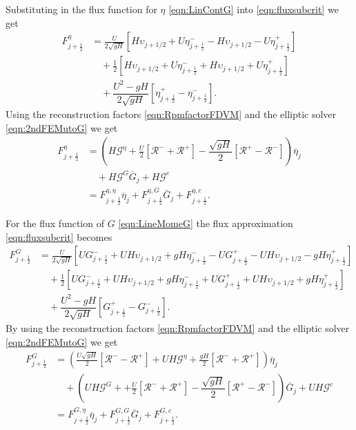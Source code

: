 Substituting in the flux function for $\eta$ \eqref{eqn:LinContG} into \eqref{eqn:fluxsubcrit} we get
\begin{align}
F^\eta_{j+\frac{1}{2}} &= \frac{U}{2 \sqrt{gH}} \left[ H\upsilon_{j+1/2} + U\eta^-_{j+\frac{1}{2}} -  H\upsilon_{j+1/2} - U \eta^+_{j+\frac{1}{2}} \right]   \nonumber \\ & \quad + \frac{1}{2}\left[H\upsilon_{j+1/2} + U\eta^-_{j+\frac{1}{2}} +  H\upsilon_{j+1/2} + U \eta^+_{j+\frac{1}{2}}\right] \nonumber \\ &\quad + \dfrac{U^2 - gH}{2\sqrt{g H}} \left [ \eta^+_{j+\frac{1}{2}} - \eta^-_{j+\frac{1}{2}} \right ].
\end{align}
Using the reconstruction factors \eqref{eqn:RpmfactorFDVM} and the elliptic solver \eqref{eqn:2ndFEMutoG} we get
\begin{align}
F^\eta_{j+\frac{1}{2}} &= \left(H\mathcal{G}^{\eta}  + \frac{U}{2}\left[ \mathcal{R}^- +  \mathcal{R}^+\right]- \dfrac{\sqrt{gH}}{2} \left [ \mathcal{R}^+ - \mathcal{R}^- \right ] \right) \overline{\eta}_j \nonumber \\  &\quad + H\mathcal{G}^G \overline{G}_{j} + H \mathcal{G}^c \nonumber \\ &= F^{\eta, \eta}_{j+\frac{1}{2}} \overline{\eta}_{j} + F^{\eta, G}_{j+\frac{1}{2}} \overline{G}_{j} + F^{\eta, c}_{j+\frac{1}{2}} .
\label{eqn:Fluxfactorsubcriteta}
\end{align}

For the flux function of $G$ \eqref{eqn:LineMomeG} the flux approximation \eqref{eqn:fluxsubcrit} becomes
\begin{align}
F^G_{j+\frac{1}{2}} &= \frac{U}{2 \sqrt{gH}} \left[ UG^-_{j+\frac{1}{2}} + UH \upsilon_{j+1/2} + gH\eta^-_{j+\frac{1}{2}} - UG^+_{j+\frac{1}{2}} - UH \upsilon_{j+1/2} - gH\eta^+_{j+\frac{1}{2}}  \right]   \nonumber \\ & \quad + \frac{1}{2}\left[UG^-_{j+\frac{1}{2}} + UH \upsilon_{j+1/2} + gH\eta^-_{j+\frac{1}{2}} + UG^+_{j+\frac{1}{2}} + UH \upsilon_{j+1/2} + gH\eta^+_{j+\frac{1}{2}}\right] \nonumber \\ & \quad+ \dfrac{U^2 - gH}{2\sqrt{g H}} \left [ G^+_{j+\frac{1}{2}} - G^-_{j+\frac{1}{2}} \right ].
\end{align}
By using the reconstruction factors \eqref{eqn:RpmfactorFDVM} and the elliptic solver \eqref{eqn:2ndFEMutoG} we get
\begin{align}
F^G_{j+\frac{1}{2}} &= \left(\frac{U\sqrt{gH}}{2} \left[ \mathcal{R}^- - \mathcal{R}^+  \right] + UH\mathcal{G}^{\eta} + \frac{gH}{2} \left[ \mathcal{R}^- +\mathcal{R}^+ \right]   \right)\overline{\eta}_j \nonumber \\ & \quad+ \left(UH\mathcal{G}^{G} + + \frac{U}{2} \left[ \mathcal{R}^- +\mathcal{R}^+ \right] - \dfrac{\sqrt{g H}}{2} \left [\mathcal{R}^+ - \mathcal{R}^- \right ]   \right) \overline{G}_j + UH\mathcal{G}^{c}  \nonumber \\
& = F^{G, \eta}_{j+\frac{1}{2}} \overline{\eta}_{j} + F^{G, G}_{j+\frac{1}{2}} \overline{G}_{j} + F^{G, c}_{j+\frac{1}{2}}   .
\label{eqn:FluxfactorsubcritG}
\end{align}




